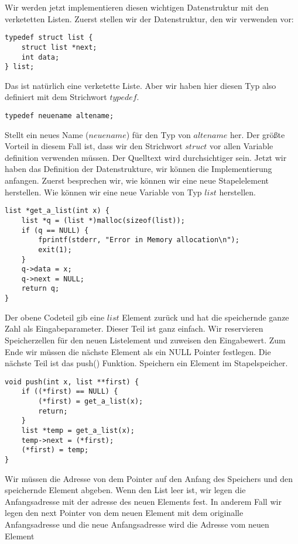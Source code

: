 \documentclass{article}[12pt]
\newenvironment{myexampleblock}[1]{%
    \tcolorbox[beamer,%
    noparskip,breakable,
    colback=White,colframe=ForestGreen,%
    colbacklower=LimeGreen!75!White,%
    title=#1]}%
    {\endtcolorbox}
\begin{document}
Wir werden jetzt implementieren diesen wichtigen Datenstruktur mit 
den verketetten Listen. Zuerst stellen wir der Datenstruktur, den wir verwenden
vor:
\begin{lstlisting}
typedef struct list {
    struct list *next;
    int data;
} list;
\end{lstlisting}
Das ist natürlich eine verketette Liste. Aber wir haben hier diesen Typ also definiert
mit dem Strichwort $typedef$.
\begin{myexampleblock}{Strichwort: \texttt{typedef}}
\begin{lstlisting}
typedef neuename altename;
\end{lstlisting}
\vspace{-0.4cm}
Stellt ein neues Name ($neuename$) für den Typ von $altename$ her.
\end{myexampleblock}
Der größte Vorteil in diesem Fall ist, dass wir den Strichwort $struct$ 
vor allen Variable definition verwenden müssen. Der Quelltext wird durchsichtiger
sein. Jetzt wir haben das Definition der Datenstrukture, wir können die Implementierung
anfangen. Zuerst besprechen wir, wie können wir eine neue Stapelelement herstellen.
Wie können wir eine neue Variable von Typ $list$ herstellen.
\begin{lstlisting}
list *get_a_list(int x) {
    list *q = (list *)malloc(sizeof(list));
    if (q == NULL) {
        fprintf(stderr, "Error in Memory allocation\n");
        exit(1);
    }
    q->data = x;
    q->next = NULL;
    return q;
}
\end{lstlisting}
Der obene Codeteil gib eine $list$ Element zurück und hat die
speichernde ganze Zahl als Eingabeparameter. Dieser Teil ist ganz einfach.
Wir reservieren Speicherzellen für den neuen Listelement und zuweisen
den Eingabewert. Zum Ende wir müssen die nächste Element als ein NULL 
Pointer festlegen. Die nächste Teil ist das push() Funktion. Speichern 
ein Element im Stapelspeicher.
\begin{lstlisting}
void push(int x, list **first) {
    if ((*first) == NULL) {
        (*first) = get_a_list(x);
        return;
    }
    list *temp = get_a_list(x);
    temp->next = (*first);
    (*first) = temp;
}
\end{lstlisting}
Wir müssen die Adresse von dem Pointer auf den Anfang des Speichers  und den speichernde 
Element abgeben. Wenn den List leer ist, wir legen die Anfangsadresse mit der adresse 
des  neuen Elements fest. In anderem Fall wir legen den next Pointer von dem neuen Element 
mit dem originalle Anfangsadresse und die neue Anfangsadresse wird die Adresse vom neuen Element 
\end{document}
